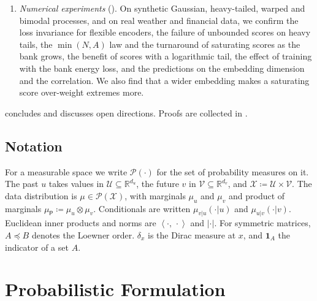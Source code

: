 \documentclass[11pt]{article}
\theoremstyle{plain}
\theoremstyle{definition}
\theoremstyle{remark}
\newcommand{\RR}{\mathbb{R}}
\newcommand{\Prob}{\mathcal{P}}
\newcommand{\UU}{\mathcal{U}}
\newcommand{\VV}{\mathcal{V}}
\newcommand{\XX}{\mathcal{X}}
\newcommand{\define}{\coloneqq}
\newcommand{\muP}{\mu_{\mathsf{P}}}
\newcommand{\IP}[2]{\left\langle #1,\, #2 \right\rangle}
\newcommand{\abs}[1]{\left\lvert #1 \right\rvert}
\newcommand{\indicator}{\mathbf{1}}
\begin{document}
\begin{enumerate}[start=1,label={(C\arabic*)}]
       (). A linear embedding of rank
       $d_z$ caps the tail index of the forecast at $\nu+d_z$
       (). Scores whose interaction is odd in the future,
       which include the inner product, its $\tanh$ version, the normalized
       cosine and $L^2$ with linear encoders, cannot use the scale part at
       all, and learn nothing when the correlation is zero
       ().
 \item \emph{Numerical experiments} ().
       On synthetic Gaussian, heavy-tailed, warped and bimodal processes, and
       on real weather and financial data, we confirm the loss invariance for
       flexible encoders, the failure of unbounded scores on heavy tails, the
       $\min(N,A)$ law and the turnaround of saturating scores as the bank
       grows, the benefit of scores with a logarithmic tail, the effect
       of training with the bank energy loss, and the predictions on the
       embedding dimension and the correlation. We also find that a wider
       embedding makes a saturating score over-weight extremes more.
\end{enumerate}
 concludes and discusses open directions.
Proofs are collected in .

\subsection{Notation}
\label{ssec:NOT}

For a measurable space we write $\Prob(\cdot)$ for the set of probability
measures on it. The past $u$ takes values in $\UU\subseteq\RR^{d_u}$, the
future $v$ in $\VV\subseteq\RR^{d_v}$, and $\XX\define\UU\times\VV$. The data
distribution is $\mu\in\Prob(\XX)$, with marginals $\mu_u$ and $\mu_v$ and
product of marginals $\muP\define\mu_u\otimes\mu_v$. Conditionals are written
$\mu_{v\vert u}(\cdot\vert u)$ and $\mu_{u\vert v}(\cdot\vert v)$. Euclidean
inner products and norms are $\IP{\cdot}{\cdot}$ and $\abs{\cdot}$. For
symmetric matrices, $A\preceq B$ denotes the Loewner order. $\delta_x$ is the
Dirac measure at $x$, and $\indicator_A$ the indicator of a set $A$.

\section{Probabilistic Formulation}
\label{sec:setting}
\end{document}
